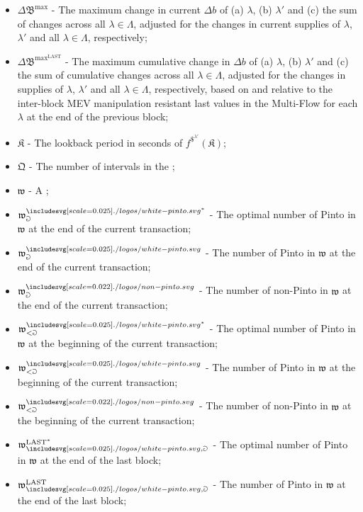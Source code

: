 \documentclass[class=article, crop=false]{standalone}
\begin{document}
\begin{itemize}[topsep=0pt, itemsep=3pt,leftmargin=16pt]

    \item[] $\Delta \mathfrak{B}^\text{max}$ - The maximum change in current $\Delta b$ of (a) $\lambda$, (b) $\lambda'$ and (c) the sum of changes across all $\lambda \in \Lambda$, adjusted for the changes in current supplies of $\lambda$, $\lambda'$ and all $\lambda \in \Lambda$, respectively;
    \item[] $\Delta \mathfrak{B}^{\text{max}^{\text{LAST}}}$ - The maximum cumulative change in $\Delta b$ of (a) $\lambda$, (b) $\lambda'$ and (c) the sum of cumulative changes across all $\lambda \in \Lambda$, adjusted for the changes in supplies of $\lambda$, $\lambda'$ and all $\lambda \in \Lambda$, respectively, based on and relative to the inter-block MEV manipulation resistant last values in the Multi-Flow  for each $\lambda$ at the end of the previous block;
    \item[] $\mathfrak{K}$ - The lookback period in seconds of $f^{\$^{\lambda'}}(\mathfrak{K})$;
    \item[] $\mathfrak{Q}$ - The number of intervals in the ;
    \item[] $\mathfrak{w}$ - A ;
    \item[] $\mathfrak{w}_{\Game}^{\pinto^{*}}$ - The optimal number of Pinto in $\mathfrak{w}$ at the end of the current transaction;
    \item[] $\mathfrak{w}_{\Game}^{\pinto}$ - The number of Pinto in $\mathfrak{w}$ at the end of the current transaction;
    \item[] $\mathfrak{w}_{\Game}^{\nonpinto}$ - The number of non-Pinto in $\mathfrak{w}$ at the end of the current transaction;
    \item[] $\mathfrak{w}_{<\Game}^{\pinto^{*}}$ - The optimal number of Pinto in $\mathfrak{w}$ at the beginning of the current transaction; 
    \item[] $\mathfrak{w}_{<\Game}^{\pinto}$ - The number of Pinto in $\mathfrak{w}$ at the beginning of the current transaction; 
    \item[] $\mathfrak{w}_{<\Game}^{\nonpinto}$ - The number of non-Pinto in $\mathfrak{w}$ at the beginning of the current transaction;
    \item[] $\mathfrak{w}_{\pinto,\Game}^{\text{LAST}^{*}}$ - The optimal number of Pinto in $\mathfrak{w}$ at the end of the last block;
    \item[] $\mathfrak{w}_{\pinto,\Game}^{\text{LAST}}$ - The number of Pinto in $\mathfrak{w}$ at the end of the last block;

\end{itemize}
\end{document}
